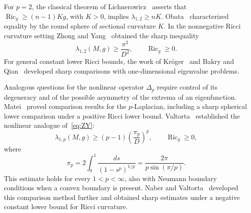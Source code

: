 \documentclass[11pt]{amsart}
\DeclareMathOperator{\Ric}{Ric}
\theoremstyle{definition}
\begin{document}
For $p=2$, the classical theorem of Lichnerowicz~\cite{Lichnerowicz1958} asserts that $\Ric_g\ge(n-1)Kg$, with $K>0$, implies $\lambda_{1,2}\ge nK$. Obata~\cite{Obata1962} characterized equality by the round sphere of sectional curvature $K$. In the nonnegative Ricci curvature setting Zhong and Yang~\cite{ZhongYang1984} obtained the sharp inequality
\begin{equation}\label{eq:ZY}
 \lambda_{1,2}(M,g)\ge\frac{\pi^2}{D^2},
 \qquad \Ric_g\ge0.
\end{equation}
For general constant lower Ricci bounds, the work of Kr\"oger~\cite{Kroger1992} and Bakry and Qian~\cite{BakryQian2000} developed sharp comparisons with one-dimensional eigenvalue problems.

Analogous questions for the nonlinear operator $\Delta_p$ require control of its degeneracy and of the possible asymmetry of the extrema of an eigenfunction. Matei~\cite{Matei2000} proved comparison results for the $p$-Laplacian, including a sharp spherical lower comparison under a positive Ricci lower bound. Valtorta~\cite{Valtorta2012} established the nonlinear analogue of~\eqref{eq:ZY}:
\begin{equation}\label{eq:Valtorta}
 \lambda_{1,p}(M,g)\ge(p-1)\left(\frac{\pi_p}{D}\right)^p,
 \qquad \Ric_g\ge0,
\end{equation}
where
\begin{equation}\label{eq:pip}
 \pi_p=2\int_0^1\frac{ds}{(1-s^p)^{1/p}}
      =\frac{2\pi}{p\sin(\pi/p)}.
\end{equation}
This estimate holds for every $1<p<\infty$, also with Neumann boundary conditions when a convex boundary is present.  Naber and Valtorta~\cite{NaberValtorta2014} developed this comparison method further and obtained sharp estimates under a negative constant lower bound for Ricci curvature. 
\end{document}
